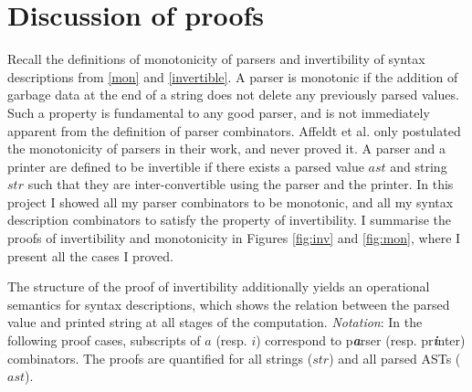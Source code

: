 \documentclass[12pt,a4paper,twoside,openright]{report}
\begin{document}
\section{Discussion of proofs} \label{disc}

Recall the definitions of monotonicity of parsers and invertibility of syntax descriptions from \autoref{mon} and \autoref{invertible}.  
A parser is monotonic if the addition of garbage data at the end of a string does not delete any previously parsed values. Such a property is fundamental to any good parser, and is not immediately apparent from the definition of parser combinators. Affeldt et al. \cite{coq-invert} only postulated the monotonicity of parsers in their work, and never proved it. 
A parser and a printer are defined to be invertible if there exists a parsed value $ast$ and string $str$ such that they are inter-convertible using the parser and the printer. In this project I showed {all} my parser combinators to be monotonic, and all my syntax description combinators to satisfy the property of invertibility. I summarise the proofs of invertibility and monotonicity in Figures \ref{fig:inv} and \ref{fig:mon}, where I present all the cases I proved.

The structure of the proof of invertibility additionally yields an operational semantics for syntax descriptions, which shows the relation between the parsed value and printed string at all stages of the computation.
\emph{Notation}: In the following proof cases, subscripts of $a$ (resp. $i$) correspond to p\textbf{\textit{a}}rser (resp. pr\textbf{\textit{i}}nter) combinators. The proofs are quantified for all strings ($str$) and all parsed ASTs ($ast$).
\end{document}
